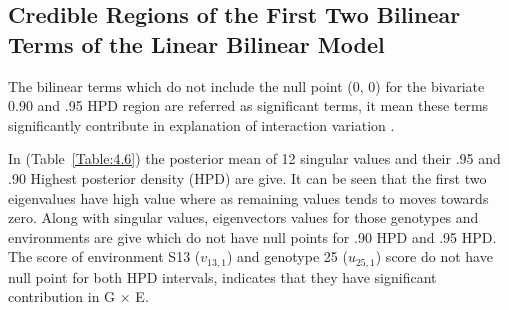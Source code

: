 \subsection{Credible Regions of the First Two Bilinear Terms of the Linear Bilinear
	Model}
The bilinear terms which do not include the null point (0, 0) for the bivariate 0.90 and .95  HPD region are referred as significant terms, it mean these terms significantly contribute in explanation of interaction variation \citep{PEREZ-ELIZALDE2011}.

In (Table~\ref{Table:4.6}) the posterior mean of 12 singular values and their .95 and .90 Highest posterior density (HPD) are give. It can be seen that the first two eigenvalues have high value where as remaining values tends to moves towards zero. Along with singular values, eigenvectors values for those genotypes and environments are give which do not have null points for .90 HPD and .95 HPD. The score of environment S13 ($v_{13,1}$) and genotype 25 ($u_{25,1}$) score do not have null point for both HPD intervals, indicates that they have significant contribution in G $\times$ E.  
